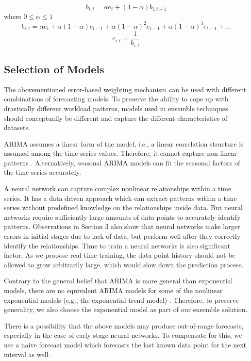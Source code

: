 $$b_{i,t}= \alpha e_t + (1-\alpha)b_{i,t-1}$$
where $0\leq \alpha \leq 1$
$$b_{i,t}=\alpha e_t + \alpha(1-\alpha)e_{t-1}+\alpha(1-\alpha)^2e_{t-1}+\alpha(1-\alpha)^3e_{t-1}+ . .. $$
$$c_{i,t}=\frac{1}{b_{i,t}}$$

\subsection{Selection of Models}
The abovementioned error-based weighting mechanism can be used with different combinations of forecasting models. To preserve the ability to cope up with drastically different workload patterns, models used in ensemble techniques should conceptually be different and capture the different characteristics of datasets.

ARIMA assumes a linear form of the model, i.e., a linear correlation structure is assumed among the time series values. Therefore, it cannot capture non-linear patterns \cite{Zhang_2003}. Alternatively, seasonal ARIMA models can fit the seasonal factors of the time series accurately.

A neural network can capture complex nonlinear relationships within a time series. It has a data driven approach which can extract patterns within a time series without predefined knowledge on the relationships inside data. But neural networks require sufficiently large amounts of data points to accurately identify patterns. Observations in Section 3 also show that neural networks make larger errors in initial stages due to lack of data, but perform well after they correctly identify the relationships. Time to train a neural networks is also significant factor. As we propose real-time training, the data point history should not be allowed to grow arbitrarily large, which would slow down the prediction process.

Contrary to the general belief that ARIMA is more general than exponential models, there are no equivalent ARIMA models for some of the nonlinear exponential models (e.g., the exponential trend model) \cite{AHyndman 2013}. Therefore, to preserve generality, we also choose the exponential model as part of our ensemble solution.

There is a possibility that the above models may produce out-of-range forecasts, especially in the case of early-stage neural networks. To compensate for this, we use a naive forecast model which forecasts the last known data point for the next interval as well.

